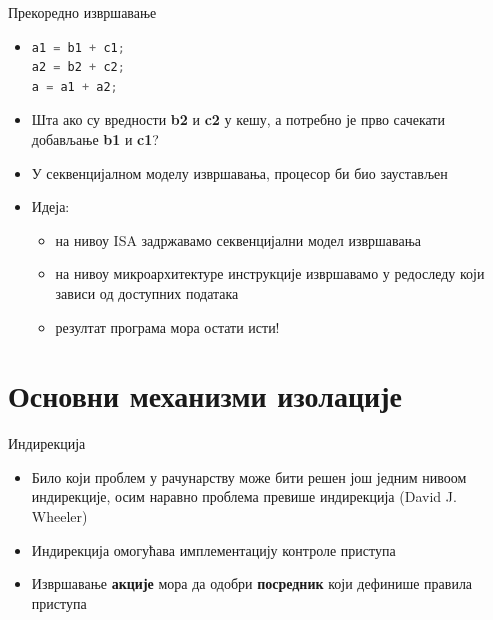 \documentclass[xcolor=table]{beamer}
\begin{document}
    \begin{frame}[fragile]{Прекоредно извршавање}
        \begin{itemize}
            \item{
                \begin{lstlisting}[language=java]
a1 = b1 + c1;
a2 = b2 + c2;
a = a1 + a2;
                \end{lstlisting}
            }
            
            \item Шта ако су вредности \textbf{b2} и \textbf{c2} у кешу, а потребно је прво сачекати добављање \textbf{b1} и \textbf{c1}?
            \item У секвенцијалном моделу извршавања, процесор би био заустављен
            \item Идеја:
            \begin{itemize}
                \item на нивоу ISA задржавамо секвенцијални модел извршавања
                \item на нивоу микроархитектуре инструкције извршавамо у редоследу који зависи од доступних података
                \item резултат програма мора остати исти!
            \end{itemize}
        \end{itemize}
    \end{frame}
    
    \section{Основни механизми изолације}
    
    \begin{frame}{Индирекција}
        \begin{itemize}
            \item Било који проблем у рачунарству може бити решен још једним нивоом индирекције, осим наравно проблема превише индирекција (David J. Wheeler)
            \item Индирекција омогућава имплементацију контроле приступа
            \item Извршавање \textbf{акције} мора да одобри \textbf{посредник} који дефинише правила приступа
        \end{itemize}
    \end{frame}
    
\end{document}
